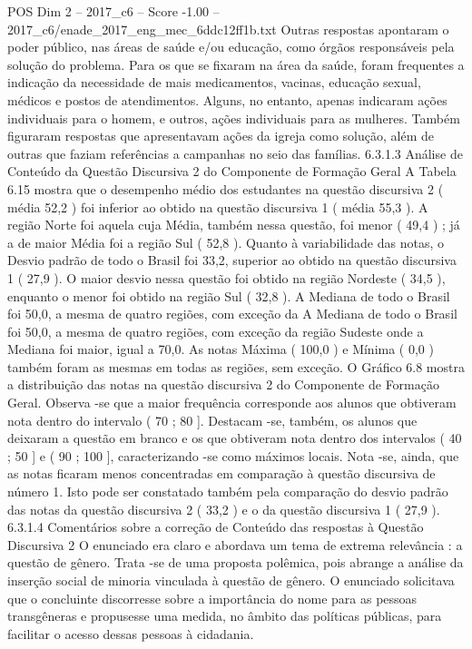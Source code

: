 \begin{textsample}{POS Dim 2 – 2017\_c6 – Score -1.00 – 2017\_c6/enade\_2017\_eng\_mec\_6ddc12ff1b.txt}
Outras respostas apontaram o poder público, nas áreas de saúde e/ou educação, como órgãos responsáveis pela solução do problema.
Para os que se fixaram na área da saúde, foram frequentes a indicação da necessidade de mais medicamentos, vacinas, educação sexual, médicos e postos de atendimentos.
Alguns, no entanto, apenas indicaram ações individuais para o homem, e outros, ações individuais para as mulheres.
Também figuraram respostas que apresentavam ações da igreja como solução, além de outras que faziam referências a campanhas no seio das famílias. 6.3.1.3 Análise de Conteúdo da Questão Discursiva 2 do Componente de Formação Geral A Tabela 6.15 mostra que o desempenho médio dos estudantes na questão discursiva 2 ( média 52,2 ) foi inferior ao obtido na questão discursiva 1 ( média 55,3 ).
A região Norte foi aquela cuja Média, também nessa questão, foi menor ( 49,4 ) ; já a de maior Média foi a região Sul ( 52,8 ).
Quanto à variabilidade das notas, o Desvio padrão de todo o Brasil foi 33,2, superior ao obtido na questão discursiva 1 ( 27,9 ).
O maior desvio nessa questão foi obtido na região Nordeste ( 34,5 ), enquanto o menor foi obtido na região Sul ( 32,8 ).
A Mediana de todo o Brasil foi 50,0, a mesma de quatro regiões, com exceção da A Mediana de todo o Brasil foi 50,0, a mesma de quatro regiões, com exceção da região Sudeste onde a Mediana foi maior, igual a 70,0.
As notas Máxima ( 100,0 ) e Mínima ( 0,0 ) também foram as mesmas em todas as regiões, sem exceção.
O Gráfico 6.8 mostra a distribuição das notas na questão discursiva 2 do Componente de Formação Geral.
Observa -se que a maior frequência corresponde aos alunos que obtiveram nota dentro do intervalo ( 70 ; 80 ].
Destacam -se, também, os alunos que deixaram a questão em branco e os que obtiveram nota dentro dos intervalos ( 40 ; 50 ] e ( 90 ; 100 ], caracterizando -se como máximos locais.
Nota -se, ainda, que as notas ficaram menos concentradas em comparação à questão discursiva de número 1.
Isto pode ser constatado também pela comparação do desvio padrão das notas da questão discursiva 2 ( 33,2 ) e o da questão discursiva 1 ( 27,9 ). 6.3.1.4 Comentários sobre a correção de Conteúdo das respostas à Questão Discursiva 2 O enunciado era claro e abordava um tema de extrema relevância : a questão de gênero.
Trata -se de uma proposta polêmica, pois abrange a análise da inserção social de minoria vinculada à questão de gênero.
O enunciado solicitava que o concluinte discorresse sobre a importância do nome para as pessoas transgêneras e propusesse uma medida, no âmbito das políticas públicas, para facilitar o acesso dessas pessoas à cidadania.

\end{textsample}

